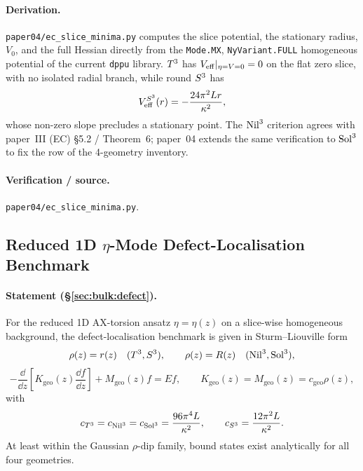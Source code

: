 \paragraph{Derivation.}
\texttt{paper04/ec\_slice\_minima.py} computes the slice potential, the
stationary radius, $V_0$, and the full Hessian directly from the
\texttt{Mode.MX}, \texttt{NyVariant.FULL} homogeneous potential of the
current \texttt{dppu} library.  $T^3$ has $V_{\mathrm{eff}}|_{\eta=V=0} = 0$ on the
flat zero slice, with no isolated radial branch, while round $S^3$ has
\begin{equation}
  V_{\mathrm{eff}}^{S^3}(r) = -\frac{24\pi^2 L r}{\kappa^2},
\end{equation}
whose non-zero slope precludes a stationary point.  The $\mathrm{Nil}^3$
criterion agrees with paper~III (EC) \cite{paper3ec} \S5.2 / Theorem~6;
paper~04 extends the same verification to $\mathrm{Sol}^3$ to fix the row of the
4-geometry inventory.

\paragraph{Verification / source.}
\texttt{paper04/ec\_slice\_minima.py}.

\subsection{Reduced 1D $\eta$-Mode Defect-Localisation Benchmark}
\label{app:E:E6}

\paragraph{Statement (\S\ref{sec:bulk:defect}).}
For the reduced 1D AX-torsion ansatz $\eta = \eta(z)$ on a slice-wise
homogeneous background, the defect-localisation benchmark is given in
Sturm--Liouville form
\begin{equation}
  \rho(z) = r(z)\quad (T^3, S^3),\qquad
  \rho(z) = R(z)\quad (\mathrm{Nil}^3, \mathrm{Sol}^3),
\end{equation}
\begin{equation}
  -\frac{\dd}{\dd z}\!\left[K_{\mathrm{geo}}(z)\frac{\dd f}{\dd z}\right]
  + M_{\mathrm{geo}}(z) f = E f,
  \qquad
  K_{\mathrm{geo}}(z) = M_{\mathrm{geo}}(z) = c_{\mathrm{geo}}\rho(z),
\end{equation}
with
\begin{equation}
  c_{T^3} = c_{\mathrm{Nil}^3} = c_{\mathrm{Sol}^3} = \frac{96\pi^4 L}{\kappa^2},
  \qquad
  c_{S^3} = \frac{12\pi^2 L}{\kappa^2}.
\end{equation}
At least within the Gaussian $\rho$-dip family, bound states exist
analytically for all four geometries.

